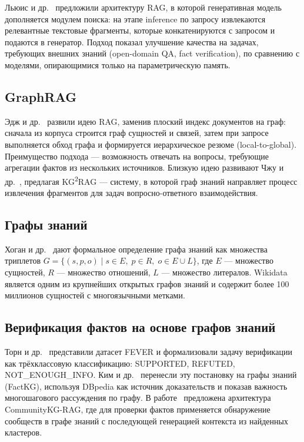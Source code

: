 \documentclass{misisarticle}
\begin{document}
Льюис и др.~\cite{lewis2020rag} предложили архитектуру RAG,
в которой генеративная модель дополняется модулем поиска:
на этапе inference по запросу извлекаются релевантные
текстовые фрагменты, которые конкатенируются с запросом
и подаются в генератор.
Подход показал улучшение качества на задачах, требующих
внешних знаний (open-domain QA, fact verification),
по сравнению с моделями, опирающимися только
на параметрическую память.

\subsection{GraphRAG}

Эдж и др.~\cite{edge2024graphrag} развили идею RAG,
заменив плоский индекс документов на граф:
сначала из корпуса строится граф сущностей и связей,
затем при запросе выполняется обход графа
и формируется иерархическое резюме (local-to-global).
Преимущество подхода — возможность отвечать на вопросы,
требующие агрегации фактов из нескольких источников.
Близкую идею развивают Чжу и др.~\cite{zhu2025kg2rag},
предлагая KG\textsuperscript{2}RAG — систему,
в которой граф знаний направляет процесс извлечения
фрагментов для задач вопросно-ответного взаимодействия.

\subsection{Графы знаний}

Хоган и др.~\cite{hogan2021kg} дают формальное определение
графа знаний как множества триплетов
$G = \{(s, p, o) \mid s \in E,\; p \in R,\; o \in E \cup L\}$,
где $E$ — множество сущностей, $R$ — множество отношений,
$L$ — множество литералов.
Wikidata~\cite{vrandecic2014wikidata} является одним из крупнейших
открытых графов знаний и содержит более 100 миллионов
сущностей с многоязычными метками.

\subsection{Верификация фактов на основе графов знаний}

Торн и др.~\cite{thorne2018fever} представили датасет FEVER
и формализовали задачу верификации как трёхклассовую
классификацию: SUPPORTED, REFUTED, NOT\_ENOUGH\_INFO.
Ким и др.~\cite{kim2023factkg} перенесли эту постановку
на графы знаний (FactKG), используя DBpedia
как источник доказательств и показав важность
многошагового рассуждения по графу.
В работе~\cite{communitykg2024} предложена архитектура
CommunityKG-RAG, где для проверки фактов применяется
обнаружение сообществ в графе знаний
с последующей генерацией контекста из найденных кластеров.
\end{document}
